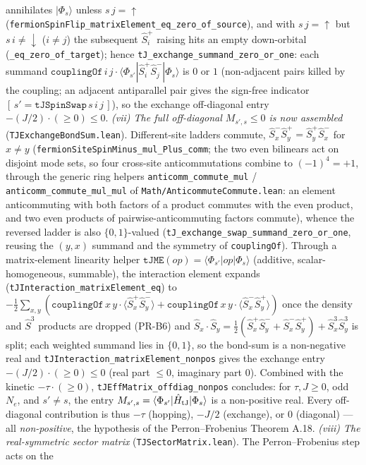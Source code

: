 \documentclass[a4paper,11pt]{article}
\begin{document}
annihilates $|\Phi_s\rangle$ unless $s\,j=\uparrow$
(\texttt{fermionSpinFlip\_matrixElement\_eq\_zero\_of\_source}), and with $s\,j=\uparrow$ but
$s\,i\neq\downarrow$ ($i\neq j$) the subsequent $\hat S^+_i$ raising hits an empty down-orbital
(\texttt{\_eq\_zero\_of\_target}); hence \texttt{tJ\_exchange\_summand\_zero\_or\_one}: each summand
$\texttt{couplingOf}\,i\,j\cdot\langle\Phi_{s'}|\hat S^+_i\hat S^-_j|\Phi_s\rangle$ is $0$ or $1$
(non-adjacent pairs killed by the coupling; an adjacent antiparallel pair gives the sign-free
indicator $[\,s'=\texttt{tJSpinSwap}\,s\,i\,j\,]$), so the exchange off-diagonal entry
$-(J/2)\cdot(\geq0)\leq0$.  \emph{(vii) The full off-diagonal $M_{s',s}\leq0$ is now assembled}
(\texttt{TJExchangeBondSum.lean}).  Different-site ladders commute,
$\hat S^-_x\hat S^+_y=\hat S^+_y\hat S^-_x$ for $x\neq y$
(\texttt{fermionSiteSpinMinus\_mul\_Plus\_comm}; the two even bilinears act on disjoint mode sets,
so four cross-site anticommutations combine to $(-1)^4=+1$, through the generic ring helpers
\texttt{anticomm\_commute\_mul} / \texttt{anticomm\_commute\_mul\_mul} of
\texttt{Math/AnticommuteCommute.lean}: an element anticommuting with both factors of a product
commutes with the even product, and two even products of pairwise-anticommuting factors commute),
whence the reversed ladder is also
$\{0,1\}$-valued (\texttt{tJ\_exchange\_swap\_summand\_zero\_or\_one}, reusing the $(y,x)$ summand
and the symmetry of \texttt{couplingOf}).  Through a matrix-element linearity helper
$\texttt{tJME}(op)=\langle\Phi_{s'}|op|\Phi_s\rangle$ (additive, scalar-homogeneous, summable), the
interaction element expands (\texttt{tJInteraction\_matrixElement\_eq}) to
$-\tfrac12\sum_{x,y}(\texttt{couplingOf}\,x\,y\cdot\langle\hat S^+_x\hat S^-_y\rangle
+\texttt{couplingOf}\,x\,y\cdot\langle\hat S^-_x\hat S^+_y\rangle)$ once the density and $\hat S^3$
products are dropped (PR-B6) and $\hat S_x\!\cdot\!\hat S_y=\tfrac12(\hat S^+_x\hat S^-_y+\hat
S^-_x\hat S^+_y)+\hat S^3_x\hat S^3_y$ is split; each weighted summand lies in $\{0,1\}$, so the
bond-sum is a non-negative real and \texttt{tJInteraction\_matrixElement\_nonpos} gives the
exchange entry $-(J/2)\cdot(\geq0)\leq0$ (real part $\leq0$, imaginary part $0$).  Combined with the
kinetic $-\tau\cdot(\geq0)$, \texttt{tJEffMatrix\_offdiag\_nonpos} concludes: for $\tau,J\geq0$, odd
$N_e$, and $s'\neq s$, the entry $M_{s',s}=\langle\Phi_{s'}|\hat H_{\rm tJ}|\Phi_s\rangle$ is a
non-positive real.  Every off-diagonal
contribution is thus $-\tau$ (hopping), $-J/2$ (exchange), or $0$ (diagonal) --- all
\emph{non-positive}, the hypothesis of the Perron--Frobenius Theorem A.18.  \emph{(viii) The
real-symmetric sector matrix} (\texttt{TJSectorMatrix.lean}).  The Perron--Frobenius step acts on the
\end{document}
